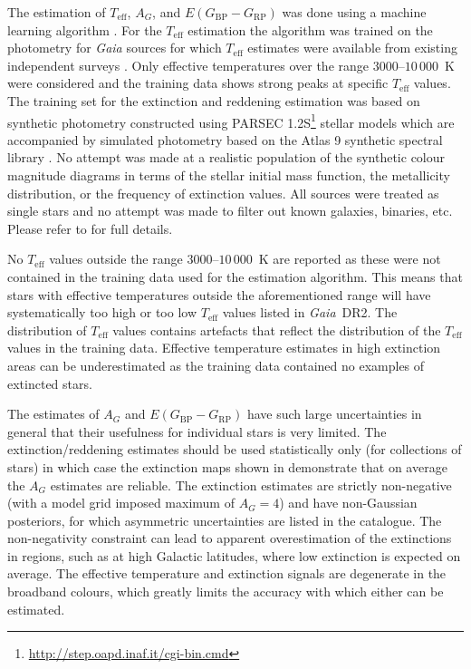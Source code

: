 \documentclass[longauth]{aa_gaia} %
\newcommand\gaia{\textit{Gaia}}
\newcommand\gdr[1]{\gaia~DR#1}
\newcommand\gbp{\ensuremath{G_\mathrm{BP}}}
\newcommand\grp{\ensuremath{G_\mathrm{RP}}}
\newcommand\teff{\ensuremath{T_\mathrm{eff}}}
\newcommand\ag{\ensuremath{A_G}}
\newcommand\ebpminrp{\ensuremath{E(\gbp-\grp)}}
\begin{document}
The estimation of {\teff}, {\ag}, and {\ebpminrp} was done using a machine learning algorithm
\citep[specifically, the extremely randomised trees, or \textsc{ExtraTrees}
algorithm][]{Geurts2006}. For the {\teff} estimation the algorithm was trained on the photometry for
{\gaia} sources for which {\teff} estimates were available from existing independent surveys
\citep[see][table 2]{DR2-DPACP-43}. Only effective temperatures over the range $3000$--$10\,000$~K
were considered and the training data shows strong peaks at specific {\teff} values. The training
set for the extinction and reddening estimation was based on synthetic photometry constructed using
PARSEC 1.2S\footnote{\url{http://step.oapd.inaf.it/cgi-bin.cmd}} stellar models which are
accompanied by simulated photometry based on the Atlas 9 synthetic spectral library
\citep{2004astro.ph..5087C}. No attempt was made at a realistic population of the synthetic colour
magnitude diagrams in terms of the stellar initial mass function, the metallicity distribution, or
the frequency of extinction values. All sources were treated as single stars and no attempt was made
to filter out known galaxies, binaries, etc. Please refer to \cite{DR2-DPACP-43} for full details.

No {\teff} values outside the range $3000$--$10\,000$~K are reported as these were not contained in
the training data used for the estimation algorithm. This means that stars with effective
temperatures outside the aforementioned range will have systematically too high or too low {\teff}
values listed in \gdr{2}. The distribution of {\teff} values contains artefacts that reflect the
distribution of the {\teff} values in the training data. Effective temperature estimates in high
extinction areas can be underestimated as the training data contained no examples of extincted
stars.

The estimates of {\ag} and {\ebpminrp} have such large uncertainties in general that their
usefulness for individual stars is very limited. The extinction/reddening estimates should be used
statistically only (for collections of stars) in which case the extinction maps shown in
\cite{DR2-DPACP-43} demonstrate that on average the {\ag} estimates are reliable. The extinction
estimates are strictly non-negative (with a model grid imposed maximum of $\ag=4$) and have
non-Gaussian posteriors, for which asymmetric uncertainties are listed in the catalogue. The
non-negativity constraint can lead to apparent overestimation of the extinctions in regions, such as
at high Galactic latitudes, where low extinction is expected on average. The effective temperature
and extinction signals are degenerate in the broadband colours, which greatly limits the accuracy
with which either can be estimated.
\end{document}
